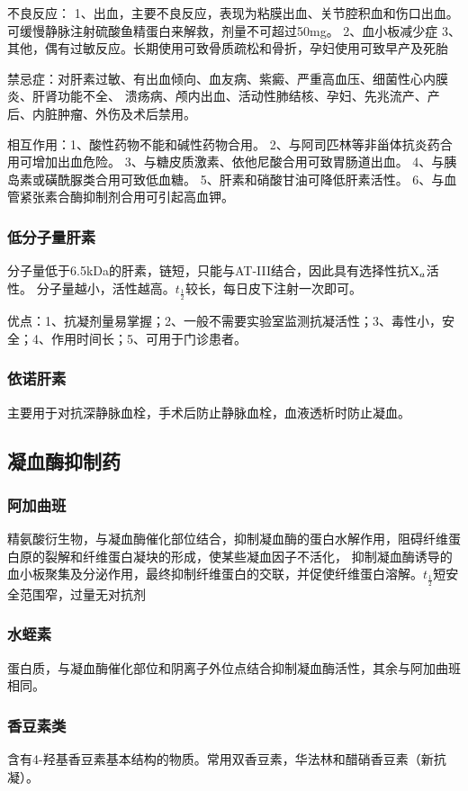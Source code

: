 \documentclass[UTF8]{ctexbook}
\begin{document}
不良反应：
1、出血，主要不良反应，表现为粘膜出血、关节腔积血和伤口出血。可缓慢静脉注射硫酸鱼精蛋白来解救，剂量不可超过50mg。
2、血小板减少症
3、其他，偶有过敏反应。长期使用可致骨质疏松和骨折，孕妇使用可致早产及死胎

禁忌症：对肝素过敏、有出血倾向、血友病、紫癜、严重高血压、细菌性心内膜炎、肝肾功能不全、
溃疡病、颅内出血、活动性肺结核、孕妇、先兆流产、产后、内脏肿瘤、外伤及术后禁用。

相互作用：1、酸性药物不能和碱性药物合用。
2、与阿司匹林等非甾体抗炎药合用可增加出血危险。
3、与糖皮质激素、依他尼酸合用可致胃肠道出血。
4、与胰岛素或磺酰脲类合用可致低血糖。
5、肝素和硝酸甘油可降低肝素活性。
6、与血管紧张素合酶抑制剂合用可引起高血钾。

\subsubsection{低分子量肝素}
分子量低于6.5kDa的肝素，链短，只能与AT-III结合，因此具有选择性抗\( \textup{X}_{a} \)活性。
分子量越小，活性越高。\( t_{\frac{1}{2}} \)较长，每日皮下注射一次即可。

优点：1、抗凝剂量易掌握；2、一般不需要实验室监测抗凝活性；3、毒性小，安全；4、作用时间长；5、可用于门诊患者。

\subsubsection{依诺肝素}
主要用于对抗深静脉血栓，手术后防止静脉血栓，血液透析时防止凝血。
\subsection{凝血酶抑制药}
\subsubsection{阿加曲班}
精氨酸衍生物，与凝血酶催化部位结合，抑制凝血酶的蛋白水解作用，阻碍纤维蛋白原的裂解和纤维蛋白凝块的形成，使某些凝血因子不活化，
抑制凝血酶诱导的血小板聚集及分泌作用，最终抑制纤维蛋白的交联，并促使纤维蛋白溶解。\(t_{\frac{1}{2}}\)短安全范围窄，过量无对抗剂

\subsubsection{水蛭素}
蛋白质，与凝血酶催化部位和阴离子外位点结合抑制凝血酶活性，其余与阿加曲班相同。

\subsubsection{香豆素类}
含有4-羟基香豆素基本结构的物质。常用双香豆素，华法林和醋硝香豆素（新抗凝）。
\end{document}
